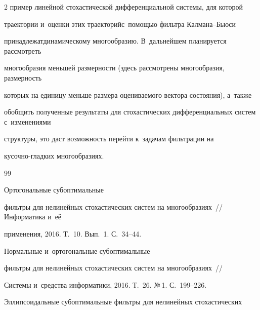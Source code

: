 \begin{multicols}{2}
пример линейной стохастической дифференциальной системы, для которой 

траектории и~оценки этих траекторий\linebreak с~по\-мощью фильтра Кал\-ма\-на--Бью\-си 

принадлежат\linebreak динамическому многообразию. В~дальнейшем планируется рассмотреть 

многообразия меньшей размерности (здесь рассмотрены многообразия, размерность 

которых на единицу меньше размера оценива\-емо\-го вектора состояния), а~также 

обобщить полученные результаты для стохастических дифференциальных сис\-тем с~изменениями 

структуры, это даст возможность перейти к~задачам фильт\-ра\-ции на 

ку\-соч\-но-глад\-ких многообразиях.





{\small\frenchspacing

 {%


 \begin{thebibliography}{99}








 Ортогональные субоптимальные 

фильтры для нелинейных стохастических систем на многообразиях~// Информатика и~её 

применения, 2016. Т.~10. Вып.~1. С.~34--44.




 Нормальные и~ортогональные субоптимальные 

фильтры для нелинейных стохастических систем на многообразиях~// 

Системы и~средства информатики, 2016. Т.~26. №\,1. С.~199--226.





Эллипсоидальные субоптимальные фильтры для нелинейных стохастических 


\end{thebibliography}}}
\end{multicols}
